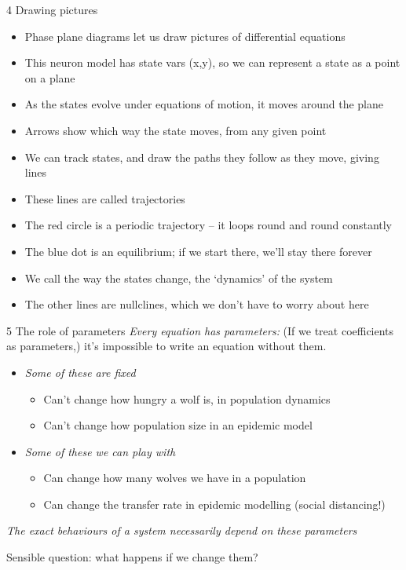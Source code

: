 \documentclass[presentation]{beamer}
\begin{document}
\begin{frame}[label={sec:org81f327e}]{4 Drawing pictures}
\begin{itemize}
\item Phase plane diagrams let us draw pictures of differential equations
\item This neuron model has state vars (x,y), so we can represent a state as a point on a plane
\item As the states evolve under equations of motion, it moves around the plane
\item Arrows show which way the state moves, from any given point
\item We can track states, and draw the paths they follow as they move, giving lines
\item These lines are called trajectories
\item The red circle is a periodic trajectory -- it loops round and round constantly
\item The blue dot is an equilibrium; if we start there, we'll stay there forever
\item \alert{We call the way the states change, the `dynamics' of the system}
\item The other lines are nullclines, which we don't have to worry about here
\end{itemize}
\end{frame}

\begin{frame}[label={sec:orgc5cc56a}]{5 The role of parameters}
\emph{Every equation has parameters:}
(If we treat coefficients as parameters,) it's impossible to write an equation without them.
\begin{itemize}
\item \emph{Some of these are fixed}
\begin{itemize}
\item Can't change how hungry a wolf is, in population dynamics
\item Can't change how population size in an epidemic model
\end{itemize}
\item \emph{Some of these we can play with}
\begin{itemize}
\item Can change how many wolves we have in a population
\item Can change the transfer rate in epidemic modelling (social distancing!)
\end{itemize}
\end{itemize}

\emph{The exact behaviours of a system necessarily depend on these parameters}

Sensible question: what happens if we change them?
\end{frame}
\end{document}
